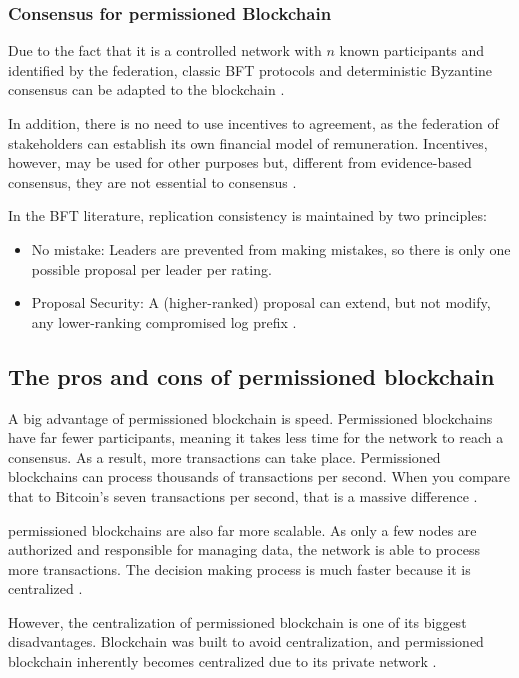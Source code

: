 \subsubsection{Consensus for permissioned Blockchain}\label{sec:consensoPrivada}
Due to the fact that it is a controlled network with $n$ known participants and identified by the federation, classic \acf{BFT} protocols and deterministic Byzantine consensus can be adapted to the blockchain \cite{androulaki2018hyperledger}.

In addition, there is no need to use incentives to agreement, as the federation of stakeholders can establish its own financial model of remuneration. Incentives, however, may be used for other purposes but, different from evidence-based consensus, they are not essential to consensus \cite{greve2018blockchain}.

In the \ac{BFT} literature, replication consistency is maintained by two principles:

\begin{itemize}
\item No mistake: Leaders are prevented from making mistakes, so there is only one possible proposal per leader per rating.
\item Proposal Security: A (higher-ranked) proposal can extend, but not modify, any lower-ranking compromised log prefix \cite{abraham2017blockchain}.
\end{itemize}

\subsection{The pros and cons of permissioned blockchain}\label{sec:prosConsPriv}

A big advantage of permissioned blockchain is speed. Permissioned blockchains have far fewer participants, meaning it takes less time for the network to reach a consensus. As a result, more transactions can take place. Permissioned blockchains can process thousands of transactions per second. When you compare that to Bitcoin’s seven transactions per second, that is a massive difference \cite{di17blockchain}.

permissioned blockchains are also far more scalable. As only a few nodes are authorized and responsible for managing data, the network is able to process more transactions. The decision making process is much faster because it is centralized \cite{selfkeyOrg}.

However, the centralization of permissioned blockchain is one of its biggest disadvantages. Blockchain was built to avoid centralization, and permissioned blockchain inherently becomes centralized due to its private network \cite{blockgeeks2018deeper}.

